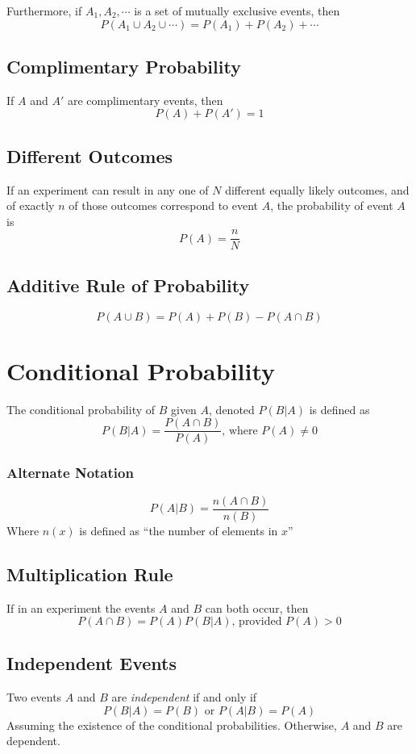\documentclass{book}
\newcommand{\note}[1]{\marginpar{\emph{Note: #1}}}
\begin{document}
Furthermore, if $A_1, A_2, \cdots$ is a set of mutually exclusive events, then $$P(A_1 \cup A_2 \cup \cdots)=P(A_1)+P(A_2)+\cdots$$

\subsection{Complimentary Probability}
If $A$ and $A'$ are complimentary events, then $$P(A)+P(A')=1$$

\subsection{Different Outcomes}

If an experiment can result in any one of $N$ different equally likely outcomes, and of exactly $n$ of those outcomes correspond to event $A$, the probability of event $A$ is $$P(A) = \frac{n}{N}$$

\subsection{Additive Rule of Probability}

$$P(A \cup B) = P(A) + P(B) - P(A \cap B)$$

\section{Conditional Probability}

The conditional probability of $B$ given $A$, denoted $P(B|A)$ is defined as $$P(B|A) = \frac{P(A \cap B)}{P(A)} \text{, where } P(A) \ne 0 $$
\note{This is a filter}

\subsubsection{Alternate Notation}
$$P(A|B) =\frac{n(A \cap B)}{n(B)}$$
Where $n(x)$ is defined as \enquote{the number of elements in $x$} 

\subsection{Multiplication Rule}
If in an experiment the events $A$ and $B$ can both occur, then $$P(A\cap B) = P(A)P(B|A)\text{, provided } P(A) > 0$$

\subsection{Independent Events}
Two events $A$ and $B$ are \emph{independent} if and only if 
$$P(B|A) = P(B) \text{ or } P(A|B)=P(A)$$
Assuming the existence of the conditional probabilities. Otherwise, $A$ and $B$ are dependent.
\end{document}
